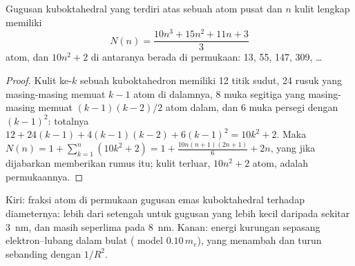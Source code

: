 \begin{proposition}\label{prop:b3:inorganic-materials:magic}
Gugusan kuboktahedral yang terdiri atas sebuah atom pusat dan $n$ kulit lengkap memiliki
\[
  N(n) = \frac{10n^3 + 15n^2 + 11n + 3}{3}
\]
atom, dan $10n^2 + 2$ di antaranya berada di permukaan: 13, 55, 147, 309, \dots
\end{proposition}

\begin{proof}
Kulit ke-$k$ sebuah kuboktahedron memiliki 12 titik sudut, 24 rusuk yang masing-masing memuat $k - 1$ atom
di dalamnya, 8 muka segitiga yang masing-masing memuat $(k - 1)(k - 2)/2$ atom dalam, dan 6
muka persegi dengan $(k - 1)^2$: totalnya $12 + 24(k - 1) + 4(k - 1)(k - 2) + 6(k - 1)^2 = 10k^2 + 2$. Maka
$N(n) = 1 + \sum_{k=1}^{n}(10k^2 + 2) = 1 + \frac{10n(n + 1)(2n + 1)}{6} + 2n$, yang jika dijabarkan memberikan rumus itu; kulit
terluar, $10n^2 + 2$ atom, adalah permukaannya.
\end{proof}

\begin{omfigure}

{\small Kiri: fraksi atom di permukaan gugusan emas kuboktahedral
terhadap diameternya: lebih dari setengah untuk gugusan yang lebih kecil daripada sekitar
\qty{3}{nm}, dan masih seperlima pada \qty{8}{nm}. Kanan: energi kurungan sepasang
elektron--lubang dalam  bulat ( model $0.10\,m_e$),
yang menambah  dan turun sebanding dengan $1/R^2$.}
\end{omfigure}

